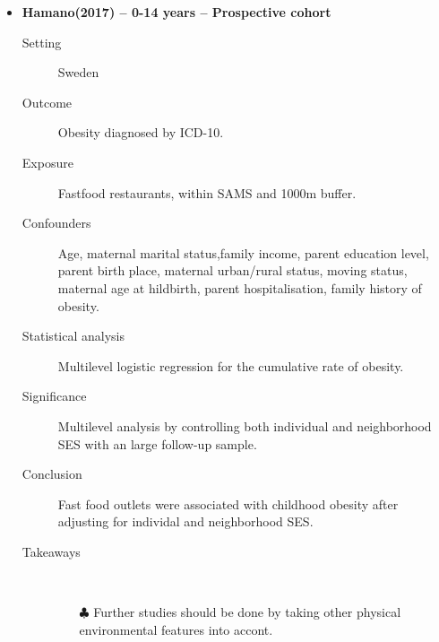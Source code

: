 \documentclass{article}
\begin{document}
\begin{itemize}
\begin{description}
		\end{description}

\newpage
\item{\bf Hamano(2017) -- 0-14 years  -- Prospective cohort} 
		\begin{description}
			\item[Setting] Sweden
			\item[Outcome] Obesity diagnosed by ICD-10. 
			\item[Exposure] Fastfood restaurants, within SAMS and 1000m buffer.
			\item[Confounders] Age, maternal marital status,family income, parent education level, parent birth place, maternal urban/rural status, moving status, maternal age at hildbirth, parent hospitalisation, family history of obesity. 
			\item[Statistical analysis] Multilevel logistic regression for the cumulative rate of obesity. 
			\item[Significance] Multilevel analysis by controlling both individual and neighborhood SES with an large follow-up sample.
			\item[Conclusion] Fast food outlets were associated with childhood obesity after adjusting for individal and neighborhood SES.
			\item[Takeaways] \mbox{}\\
				\begin{itemize}
					\item[$\clubsuit$] Further studies should be done by taking other physical environmental features into accont.
				\end{itemize} 
			
		\end{description}


\end{itemize}
\end{document}
